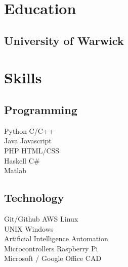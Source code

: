 \documentclass{deedy-resume-reversed}
\begin{document}
\begin{minipage}[t]{0.60\textwidth}

% 
% 

%
%

\end{minipage}
\hfill
\begin{minipage}[t]{0.33\textwidth}


\section{Education}

\subsection{University of Warwick}
\sectionsep


\section{Skills}
\subsection{Programming}
Python \textbullet{} C/C++ \\ Java \textbullet{} Javascript\\
PHP \textbullet{} HTML/CSS \\ Haskell \textbullet{} C\# \\
Matlab \\
\sectionsep

\subsection{Technology}
Git/Github \textbullet{} AWS \textbullet{} Linux \\
UNIX \textbullet{} Windows \\
Artificial Intelligence \textbullet{} Automation \\
Microcontrollers \textbullet{} Raspberry Pi \\
Microsoft / Google Office \textbullet{} CAD
\sectionsep


\end{minipage}
\end{document}
